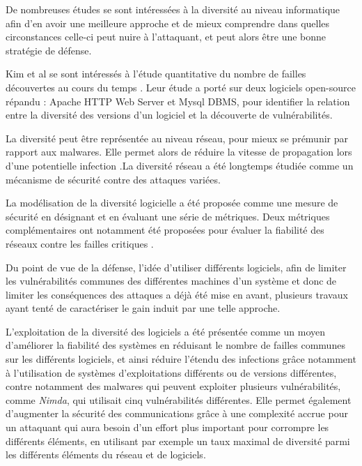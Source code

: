 De nombreuses études se sont intéressées à la diversité au niveau informatique afin d'en avoir une meilleure approche et de mieux comprendre dans quelles circonstances celle-ci peut nuire à l’attaquant, et peut alors être une bonne stratégie de défense.

Kim et al se sont intéressés à l’étude quantitative du nombre de failles découvertes au cours du temps \cite{vulnerabilityDiscovery}. Leur étude a porté sur deux logiciels open-source répandu : Apache HTTP Web Server et Mysql DBMS, pour identifier la relation entre la diversité des versions d’un logiciel et la découverte de vulnérabilités.

La diversité peut être représentée au niveau réseau, pour mieux se prémunir par rapport aux malwares. Elle permet alors de réduire la vitesse de propagation lors d’une potentielle infection \cite{OptimisingNetwork}.La diversité réseau a été longtemps étudiée comme un mécanisme de sécurité contre des attaques variées.

La modélisation de la diversité logicielle a été proposée comme une mesure de sécurité en désignant et en évaluant une série de métriques. Deux métriques complémentaires ont notamment été proposées pour évaluer la fiabilité des réseaux contre les failles critiques \cite{networkDiversity}.

Du point de vue de la défense, l'idée d'utiliser différents logiciels, afin de limiter les vulnérabilités communes des différentes machines d’un système et donc de limiter les conséquences des attaques a déjà été mise en avant, plusieurs travaux ayant tenté de caractériser le gain induit par une telle approche\cite{softwareDiversity:Security}.

L'exploitation de la diversité des logiciels a été présentée comme un moyen d'améliorer la fiabilité des systèmes en réduisant le nombre de failles communes sur les différents logiciels, et ainsi réduire l’étendu des infections grâce notamment à l’utilisation de systèmes d'exploitations différents ou de versions différentes,\cite{softwareDiversityPracticalStatistics}
contre notamment des malwares qui peuvent exploiter plusieurs vulnérabilités, comme \textit{Nimda}, qui utilisait cinq vulnérabilités différentes. 
Elle permet également d'augmenter la sécurité des communications grâce à une complexité accrue pour un attaquant qui aura besoin d’un effort plus important pour corrompre les différents éléments, en utilisant par exemple un taux maximal de diversité\cite{maximalRatio} parmi les différents éléments du réseau et de logiciels. 

